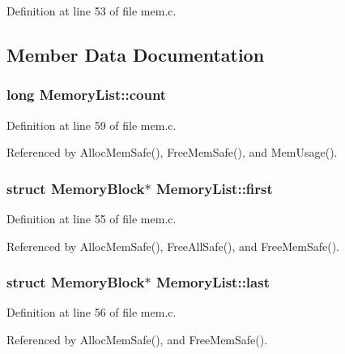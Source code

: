 Definition at line 53 of file mem.\+c.



\subsection{Member Data Documentation}
\subsubsection[{\texorpdfstring{count}{count}}]{\setlength{\rightskip}{0pt plus 5cm}long Memory\+List\+::count}\hypertarget{structMemoryList_a6b5a62d10829b019db9b45eaf1928151}{}\label{structMemoryList_a6b5a62d10829b019db9b45eaf1928151}


Definition at line 59 of file mem.\+c.



Referenced by Alloc\+Mem\+Safe(), Free\+Mem\+Safe(), and Mem\+Usage().

\subsubsection[{\texorpdfstring{first}{first}}]{\setlength{\rightskip}{0pt plus 5cm}struct {\bf Memory\+Block}$\ast$ Memory\+List\+::first}\hypertarget{structMemoryList_a0d47ad7371bb5f38e09ca5f35d85cecb}{}\label{structMemoryList_a0d47ad7371bb5f38e09ca5f35d85cecb}


Definition at line 55 of file mem.\+c.



Referenced by Alloc\+Mem\+Safe(), Free\+All\+Safe(), and Free\+Mem\+Safe().

\subsubsection[{\texorpdfstring{last}{last}}]{\setlength{\rightskip}{0pt plus 5cm}struct {\bf Memory\+Block}$\ast$ Memory\+List\+::last}\hypertarget{structMemoryList_afea5b720cf2a7c326cb53a604b90c354}{}\label{structMemoryList_afea5b720cf2a7c326cb53a604b90c354}


Definition at line 56 of file mem.\+c.



Referenced by Alloc\+Mem\+Safe(), and Free\+Mem\+Safe().

